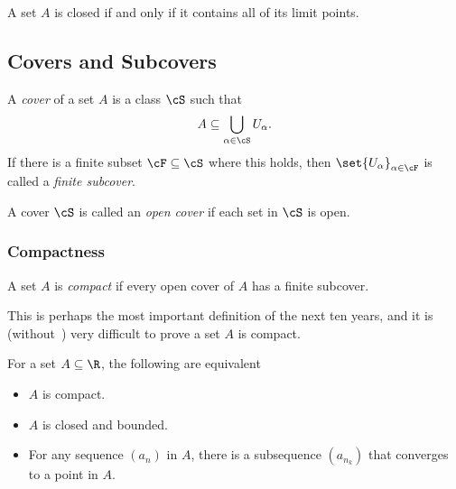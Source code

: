 \documentclass{article}
\begin{document}
\begin{thm}\label{defn:closed-iff-limit-points}
  A set $A$ is closed if and only if it contains all of its limit points.
\end{thm}

\subsection{Covers and Subcovers}

\begin{defn}[Cover]\label{defn:cover}
  A \emph{cover} of a set $A$ is a class $\cS$ such that
  \[ A \subseteq \bigcup_{\alpha \in \cS}U_{\alpha}. \]
  If there is a finite subset $\cF \subseteq \cS$ where this holds, then $\set{U_{\alpha}}_{\alpha \in \cF}$
  is called a \emph{finite subcover}.
\end{defn}

\begin{defn}\label{defn:open-cover}
  A cover $\cS$ is called an \emph{open cover} if each set in $\cS$ is open.
\end{defn}

\subsubsection{Compactness}

\begin{defn}[Compactness]\label{defn:compact-set}
  A set $A$ is \emph{compact} if every open cover of $A$ has a finite subcover.
\end{defn}
This is perhaps the most important definition of the next ten years, and it is (without~) very difficult
to prove a set $A$ is compact.

\begin{thm}\label{thm:heine-borel}
  For a set $A \subseteq \R$, the following are equivalent
  \begin{itemize}
    \item $A$ is compact.
    \item $A$ is closed and bounded.
    \item For any sequence $(a_{n})$ in $A$, there is a subsequence $(a_{n_{k}})$ that converges to a point in $A$.
  \end{itemize}
\end{thm}
\end{document}
